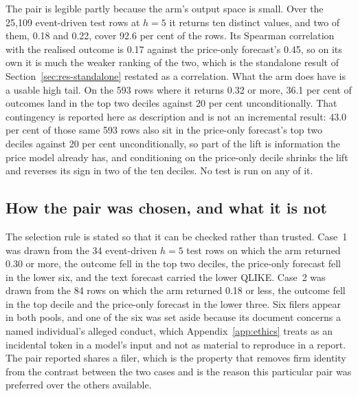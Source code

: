 The pair is legible partly because the arm's output space is small. Over the
25{,}109 event-driven test rows at $h{=}5$ it returns ten distinct values, and
two of them, 0.18 and 0.22, cover 92.6 per cent of the rows. %
Its Spearman correlation with the realised outcome is 0.17 against the
price-only forecast's 0.45, so on its own it is much the weaker ranking of the
two, which is the standalone result of Section~\ref{sec:res-standalone}
restated as a correlation. %
What the arm does have is a usable high tail. On the 593 rows where it returns
0.32 or more, 36.1 per cent of outcomes land in the top two deciles against
20 per cent unconditionally. %
That contingency is reported here as description and is not an incremental
result: 43.0 per cent of those same 593 rows also sit in the price-only
forecast's top two deciles against 20 per cent unconditionally, so part of the
lift is information the price model already has, and conditioning on the
price-only decile shrinks the lift and reverses its sign in two of the ten
deciles. %
No test is run on any of it.

\subsection*{How the pair was chosen, and what it is not}

The selection rule is stated so that it can be checked rather than trusted.
Case~1 was drawn from the 34 event-driven $h{=}5$ test rows on which the arm
returned 0.30 or more, the outcome fell in the top two deciles, the price-only
forecast fell in the lower six, and the text forecast carried the lower QLIKE. %
Case~2 was drawn from the 84 rows on which the arm returned 0.18 or less, the
outcome fell in the top decile and the price-only forecast in the lower three. %
Six filers appear in both pools, and one of the six was set aside because
its document concerns a named individual's alleged conduct, which
Appendix~\ref{app:ethics} treats as an incidental token in a model's input and
not as material to reproduce in a report. %
The pair reported shares a filer, which is the property that removes firm
identity from the contrast between the two cases and is the reason this
particular pair was preferred over the others available.


